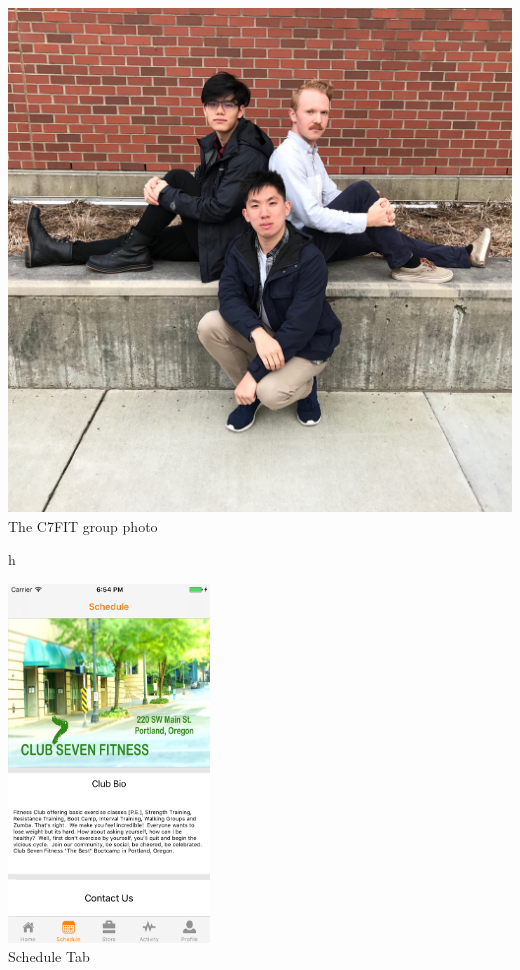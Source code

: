 \begin{center}

\includegraphics[width=\textwidth]{img/group_photo} \\
The C7FIT group photo \\
\vfill

h

\includegraphics[width=0.4\textwidth]{img/schedule_screen} \\
Schedule Tab \\
\vfill


\end{center}
